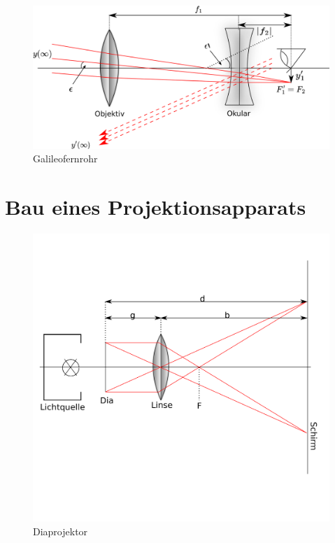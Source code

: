 \begin{figure}
    \centering
    \includegraphics[scale=0.8]{Geometrische_Optik/Protokoll/fig/Galileofernrohr.png}
    \caption{Galileofernrohr}
    \label{fig:Galileofernrohr}
\end{figure}

\section{Bau eines Projektionsapparats}

\begin{figure}
    \centering
    \includegraphics[scale=0.8]{Geometrische_Optik/Protokoll/fig/Diaprojektor.png}
    \caption{Diaprojektor}
    \label{fig:Diaprojektor}
\end{figure}

